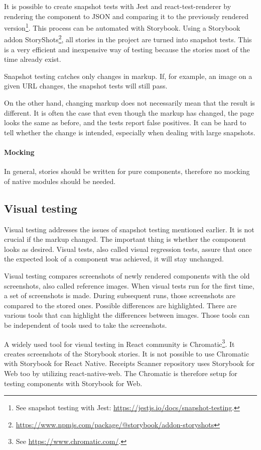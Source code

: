 \documentclass[
  digital, %
  table,   %
  oneside, %
  lof,     %
  lot,     %
]{fithesis3}
\begin{document}
It is possible to create snapshot tests with Jest and react-test-renderer by rendering the component to JSON and comparing it to the previously rendered version\footnote{See snapshot testing with Jest: \url{https://jestjs.io/docs/snapshot-testing}.}. This process can be automated with Storybook. Using a Storybook addon StoryShots\footnote{\url{https://www.npmjs.com/package/@storybook/addon-storyshots}}, all stories in the project are turned into snapshot tests. This is a very efficient and inexpensive way of testing because the stories most of the time already exist.

Snapshot testing catches only changes in markup. If, for example, an image on a given URL changes, the snapshot tests will still pass. 

On the other hand, changing markup does not necessarily mean that the result is different. It is often the case that even though the markup has changed, the page looks the same as before, and the tests report false positives. It can be hard to tell whether the change is intended, especially when dealing with large snapshots.

\paragraph{Mocking}
In general, stories should be written for pure components, therefore no mocking of native modules should be needed.

\subsection{Visual testing}
\label{sec:visual_testing}
Visual testing addresses the issues of snapshot testing mentioned earlier. It is not crucial if the markup changed. The important thing is whether the component looks as desired. Visual tests, also called visual regression tests, assure that once the expected look of a component was achieved, it will stay unchanged.

Visual testing compares screenshots of newly rendered components with the old screenshots, also called reference images.
When visual tests run for the first time, a set of screenshots is made. During subsequent runs, those screenshots are compared to the stored ones. Possible differences are highlighted. There are various tools that can highlight the differences between images. Those tools can be independent of tools used to take the screenshots.

A widely used tool for visual testing in React community is Chromatic\footnote{See \url{https://www.chromatic.com/}.}. It creates screenshots of the Storybook stories. It is not possible to use Chromatic with Storybook for React Native. Receipts Scanner repository uses Storybook for Web too by utilizing react-native-web. The Chromatic is therefore setup for testing components with Storybook for Web.
\end{document}
